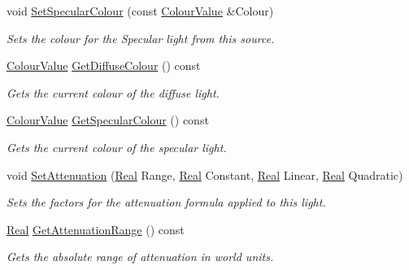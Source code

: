 \begin{DoxyCompactItemize}
void \hyperlink{classphys_1_1Light_a158a24f8f46b4fb86f483267730f22d7}{SetSpecularColour} (const \hyperlink{classphys_1_1ColourValue}{ColourValue} \&Colour)
\begin{DoxyCompactList}\small\item\em Sets the colour for the Specular light from this source. \item\end{DoxyCompactList}\item 
\hyperlink{classphys_1_1ColourValue}{ColourValue} \hyperlink{classphys_1_1Light_a75d4d4c33bf0f552e48f280a80dc5fb4}{GetDiffuseColour} () const 
\begin{DoxyCompactList}\small\item\em Gets the current colour of the diffuse light. \item\end{DoxyCompactList}\item 
\hyperlink{classphys_1_1ColourValue}{ColourValue} \hyperlink{classphys_1_1Light_a05c7ab32ddb1acf71a041098fbb9ff35}{GetSpecularColour} () const 
\begin{DoxyCompactList}\small\item\em Gets the current colour of the specular light. \item\end{DoxyCompactList}\item 
void \hyperlink{classphys_1_1Light_a22294ff531c0767bc83e7702954e1277}{SetAttenuation} (\hyperlink{namespacephys_af7eb897198d265b8e868f45240230d5f}{Real} Range, \hyperlink{namespacephys_af7eb897198d265b8e868f45240230d5f}{Real} Constant, \hyperlink{namespacephys_af7eb897198d265b8e868f45240230d5f}{Real} Linear, \hyperlink{namespacephys_af7eb897198d265b8e868f45240230d5f}{Real} Quadratic)
\begin{DoxyCompactList}\small\item\em Sets the factors for the attenuation formula applied to this light. \item\end{DoxyCompactList}\item 
\hyperlink{namespacephys_af7eb897198d265b8e868f45240230d5f}{Real} \hyperlink{classphys_1_1Light_ad113608997af66646ed91c28acb9057c}{GetAttenuationRange} () const 
\begin{DoxyCompactList}\small\item\em Gets the absolute range of attenuation in world units. \item\end{DoxyCompactList}\item 

\end{DoxyCompactItemize}
